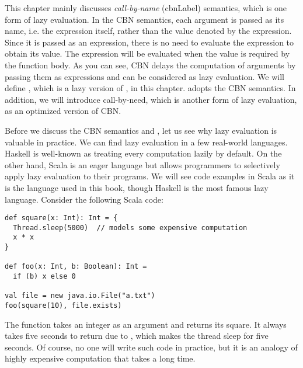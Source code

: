 This chapter mainly discusses \textit{call-by-name}
(\acrshort{cbnLabel}) semantics, which is one form of lazy evaluation.
In the CBN semantics, each argument is passed as its name, i.e. the expression
itself, rather than the value denoted by the expression. Since it is passed as an
expression, there is no need to evaluate the expression to obtain its value. The
expression will be evaluated when the value is required by the function body.
As you can see, CBN delays the computation of arguments by passing them as
expressions and can be considered as lazy evaluation. We will define \lang, which
is a lazy version of \plang, in this chapter. \lang adopts the CBN semantics. In
addition, we will introduce call-by-need, which is another form of lazy
evaluation, as an optimized version of CBN.

Before we discuss the CBN semantics and \lang, let us see why lazy evaluation is
valuable in practice. We can find lazy evaluation in a few real-world languages.
Haskell is well-known as treating every computation lazily by
default. On the
other hand, Scala is an eager language but allows programmers to selectively
apply lazy evaluation to their programs. We will see code examples in Scala as
it is the language used in this book, though Haskell is the most famous lazy
language. Consider the following Scala code:

\begin{verbatim}
def square(x: Int): Int = {
  Thread.sleep(5000)  // models some expensive computation
  x * x
}

def foo(x: Int, b: Boolean): Int =
  if (b) x else 0

val file = new java.io.File("a.txt")
foo(square(10), file.exists)
\end{verbatim}

The function  takes an integer as an argument and returns its
square. It always takes five seconds to return due to ,
which makes the thread sleep for five seconds. Of course, no one will write
such code in practice, but it is an analogy of highly expensive computation that
takes a long time.

